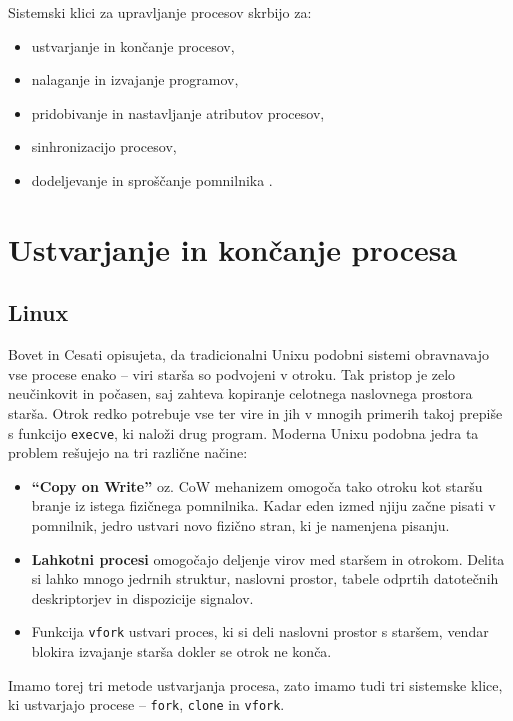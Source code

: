 \documentclass[a4paper,12pt,openright]{book}
\begin{document}
Sistemski klici za upravljanje procesov skrbijo za:
\begin{itemize}
	\item ustvarjanje in končanje procesov,
	\item nalaganje in izvajanje programov,
	\item pridobivanje in nastavljanje atributov procesov,
	\item sinhronizacijo procesov,
	\item dodeljevanje in sproščanje pomnilnika \cite{Silberschatz_Galvin_Gagne_2018}.
\end{itemize}

\section{Ustvarjanje in končanje procesa}

\subsection{Linux}

Bovet in Cesati \cite{Bovet_Cesati_2005} opisujeta, da tradicionalni Unixu podobni sistemi obravnavajo vse procese enako -- viri starša so podvojeni v otroku.
Tak pristop je zelo neučinkovit in počasen, saj zahteva kopiranje celotnega naslovnega prostora starša.
Otrok redko potrebuje vse ter vire in jih v mnogih primerih takoj prepiše s funkcijo \texttt{execve}, ki naloži drug program.
Moderna Unixu podobna jedra ta problem rešujejo na tri različne načine:
\begin{itemize}
	\item \textbf{``Copy on Write''} oz. CoW mehanizem omogoča tako otroku kot staršu branje iz istega fizičnega pomnilnika.
	      Kadar eden izmed njiju začne pisati v pomnilnik, jedro ustvari novo fizično stran, ki je namenjena pisanju.
	\item \textbf{Lahkotni procesi} omogočajo deljenje virov med staršem in otrokom.
	      Delita si lahko mnogo jedrnih struktur, naslovni prostor, tabele odprtih datotečnih deskriptorjev in dispozicije signalov.
	\item Funkcija \texttt{vfork} ustvari proces, ki si deli naslovni prostor s staršem, vendar blokira izvajanje starša dokler se otrok ne konča.
\end{itemize}

Imamo torej tri metode ustvarjanja procesa, zato imamo tudi tri sistemske klice, ki ustvarjajo procese -- \texttt{fork}, \texttt{clone} in \texttt{vfork}.
\end{document}
